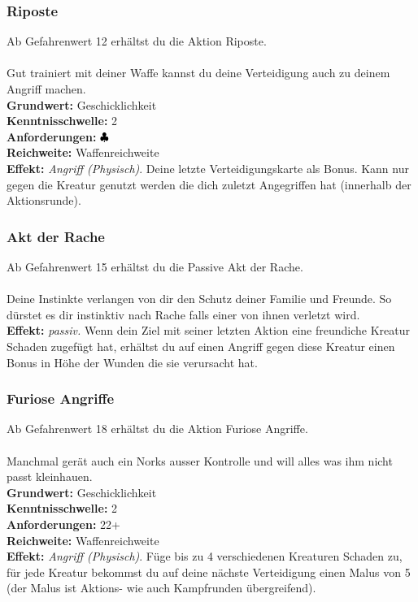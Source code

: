 \subsubsection*{ Riposte} \label{sk:riposte}
Ab Gefahrenwert 12 erhältst du die Aktion Riposte.\\
\\
Gut trainiert mit deiner Waffe kannst du deine Verteidigung auch zu deinem Angriff machen. \\
\textbf{Grundwert:} Geschicklichkeit \\
\textbf{Kenntnisschwelle:} 2 \\
\textbf{Anforderungen:} ${\color{blue} }{\color{black}\clubsuit}$ \\
\textbf{Reichweite:} Waffenreichweite \\
\textbf{Effekt:} \textit{Angriff (Physisch)}. Deine letzte Verteidigungskarte als Bonus. Kann nur gegen die Kreatur genutzt werden die dich zuletzt Angegriffen hat (innerhalb der Aktionsrunde). 

\subsubsection*{ Akt der Rache} \label{sk:aktderrache}
Ab Gefahrenwert 15 erhältst du die Passive Akt der Rache.\\
\\
Deine Instinkte verlangen von dir den Schutz deiner Familie und Freunde. So dürstet es dir instinktiv nach Rache falls einer von ihnen verletzt wird. \\
\textbf{Effekt:} \textit{passiv.} Wenn dein Ziel mit seiner letzten Aktion eine freundiche Kreatur Schaden zugefügt hat, erhältst du auf einen Angriff gegen diese Kreatur einen Bonus in Höhe der Wunden die sie verursacht hat.\\

\subsubsection*{ Furiose Angriffe} \label{sk:furioseangriffe}
Ab Gefahrenwert 18 erhältst du die Aktion Furiose Angriffe.\\
\\
Manchmal gerät auch ein Norks ausser Kontrolle und will alles was ihm nicht passt kleinhauen. \\
\textbf{Grundwert:} Geschicklichkeit \\
\textbf{Kenntnisschwelle:} 2 \\
\textbf{Anforderungen:} 22+ \\
\textbf{Reichweite:} Waffenreichweite \\
\textbf{Effekt:} \textit{Angriff (Physisch)}. Füge bis zu 4 verschiedenen Kreaturen Schaden zu, für jede Kreatur bekommst du auf deine nächste Verteidigung einen Malus von 5 (der Malus ist Aktions- wie auch Kampfrunden übergreifend).

